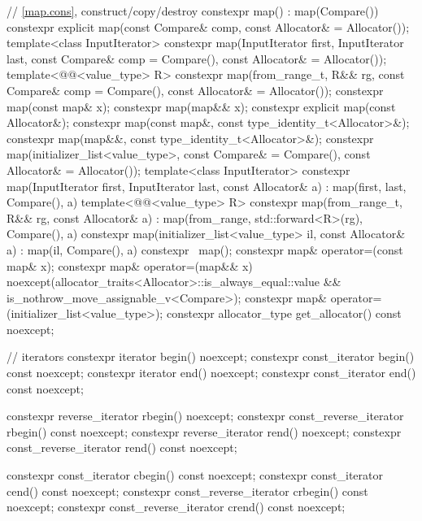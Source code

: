 \begin{codeblock}
{{    // \ref{map.cons}, construct/copy/destroy
    constexpr map() : map(Compare()) { }
    constexpr explicit map(const Compare& comp, const Allocator& = Allocator());
    template<class InputIterator>
      constexpr map(InputIterator first, InputIterator last,
                    const Compare& comp = Compare(), const Allocator& = Allocator());
    template<@@<value_type> R>
      constexpr map(from_range_t, R&& rg, const Compare& comp = Compare(),
                    const Allocator& = Allocator());
    constexpr map(const map& x);
    constexpr map(map&& x);
    constexpr explicit map(const Allocator&);
    constexpr map(const map&, const type_identity_t<Allocator>&);
    constexpr map(map&&, const type_identity_t<Allocator>&);
    constexpr map(initializer_list<value_type>, const Compare& = Compare(),
                  const Allocator& = Allocator());
    template<class InputIterator>
      constexpr map(InputIterator first, InputIterator last, const Allocator& a)
        : map(first, last, Compare(), a) { }
    template<@@<value_type> R>
      constexpr map(from_range_t, R&& rg, const Allocator& a)
        : map(from_range, std::forward<R>(rg), Compare(), a) { }
    constexpr map(initializer_list<value_type> il, const Allocator& a)
      : map(il, Compare(), a) { }
    constexpr ~map();
    constexpr map& operator=(const map& x);
    constexpr map& operator=(map&& x)
      noexcept(allocator_traits<Allocator>::is_always_equal::value &&
               is_nothrow_move_assignable_v<Compare>);
    constexpr map& operator=(initializer_list<value_type>);
    constexpr allocator_type get_allocator() const noexcept;

    // iterators
    constexpr iterator               begin() noexcept;
    constexpr const_iterator         begin() const noexcept;
    constexpr iterator               end() noexcept;
    constexpr const_iterator         end() const noexcept;

    constexpr reverse_iterator       rbegin() noexcept;
    constexpr const_reverse_iterator rbegin() const noexcept;
    constexpr reverse_iterator       rend() noexcept;
    constexpr const_reverse_iterator rend() const noexcept;

    constexpr const_iterator         cbegin() const noexcept;
    constexpr const_iterator         cend() const noexcept;
    constexpr const_reverse_iterator crbegin() const noexcept;
    constexpr const_reverse_iterator crend() const noexcept;

}}
\end{codeblock}
